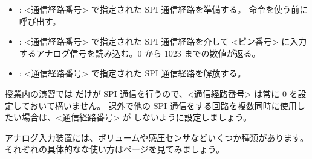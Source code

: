 \documentclass[text05.tex]{subfiles}
\begin{document}
\begin{itemize}
\item {}: <通信経路番号> で指定された SPI 通信経路を準備する。\code{\adcget} 命令を使う前に呼び出す。
\item {}: <通信経路番号> で指定された SPI 通信経路を介して <ピン番号> に入力するアナログ信号を読み込む。$0$ から $1023$ までの数値が返る。
\item {}: <通信経路番号> で指定された SPI 通信経路を解放する。
\end{itemize}

授業内の演習では \ADC だけが SPI 通信を行うので、<通信経路番号> は常に 0 を設定しておいて構いません。
課外で他の SPI 通信をする回路を複数同時に使用したい場合は、<通信経路番号> が しないように設定しましょう。

アナログ入力装置には、ボリュームや感圧センサなどいくつか種類があります。それぞれの具体的なな使い方は\pageref{analog_in}ページを見てみましょう。\\

\begin{tcolorbox}[title=\useOmetoi]
\begin{enumerate}
\end{enumerate}
\end{tcolorbox}
\end{document}
